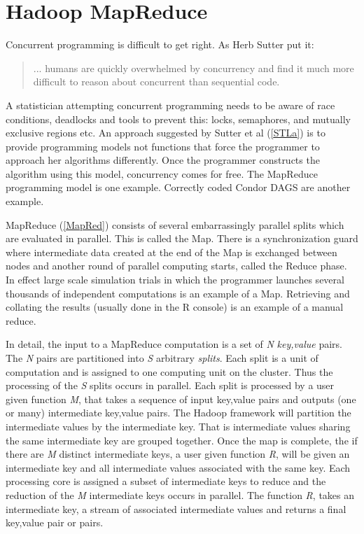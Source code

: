 \documentclass[letterpaper,10pt,english]{sphinxmanual}
\begin{document}
\section{Hadoop MapReduce}
\label{introduction:hadoop-mapreduce}
Concurrent programming is difficult to get right. As Herb Sutter put it:
\begin{quote}

... humans are quickly overwhelmed by concurrency and find it much more difficult to reason about concurrent than sequential code.
\end{quote}

A statistician attempting concurrent programming needs to be aware of race
conditions, deadlocks and tools to prevent this: locks, semaphores, and
mutually exclusive regions etc. An approach suggested by Sutter et al (\hyperref[introduction:stla]{{[}STLa{]}}) is to
provide programming models not functions that force
the programmer to approach her algorithms differently. Once the programmer
constructs the algorithm using this model, concurrency comes for free.  The
MapReduce programming model is one example. Correctly coded Condor DAGS are another
example.

MapReduce (\hyperref[introduction:mapred]{{[}MapRed{]}}) consists of several embarrassingly parallel splits which are evaluated
in parallel. This is called the Map. There is a synchronization guard where
intermediate data created at the end of the Map is exchanged between nodes and
another round of parallel computing starts, called the Reduce phase. In effect
large scale simulation trials in which the programmer launches several thousands
of independent computations is an example of a Map. Retrieving and collating the
results (usually done in the R console) is an example of a manual reduce.

In detail, the input to a MapReduce computation is a set of \emph{N} \emph{key,value}
pairs. The \emph{N} pairs are partitioned into \emph{S} arbitrary \emph{splits}. Each split is
a unit of computation and is assigned to one computing unit on the cluster. Thus
the processing of the \emph{S} splits occurs in parallel. Each split is processed by
a user given function \emph{M}, that takes a sequence of input key,value pairs and outputs
(one or many) intermediate key,value pairs. The Hadoop framework will partition
the intermediate values by the intermediate key. That is intermediate values
sharing the same intermediate key are grouped together. Once the map is
complete, the if there are \emph{M} distinct intermediate keys, a user given function
\emph{R}, will be given an intermediate key and all intermediate values associated
with the same key. Each processing core is assigned a subset of intermediate
keys to reduce and the reduction of the \emph{M} intermediate keys occurs in
parallel. The function \emph{R}, takes an intermediate key, a stream of associated
intermediate values and returns a final key,value pair or pairs.
\end{document}
